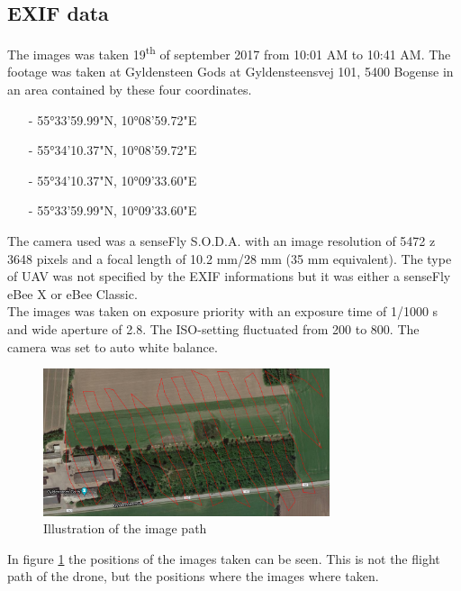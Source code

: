 \documentclass[../Head/Main.tex]{subfiles}
\begin{document}
\subsection{EXIF data}
The images was taken 19\textsuperscript{th} of september 2017 from 10:01 AM to 10:41 AM. The footage was taken at Gyldensteen Gods at Gyldensteensvej 101, 5400 Bogense in an area contained by these four coordinates.
\begin{itemize}
\item[-] 55°33'59.99"N, 10°08'59.72"E \vspace{-7pt}
\item[-] 55°34'10.37"N, 10°08'59.72"E \vspace{-7pt}
\item[-] 55°34'10.37"N, 10°09'33.60"E \vspace{-7pt}
\item[-] 55°33'59.99"N, 10°09'33.60"E
\end{itemize}

The camera used was a senseFly S.O.D.A. with an image resolution of 5472 z 3648 pixels and a focal length of 10.2 mm/28 mm (35 mm equivalent). The type of UAV was not specified by the EXIF informations but it was either a senseFly eBee X or eBee Classic.\\

The images was taken on exposure priority with an exposure time of 1/1000 s and wide aperture of 2.8. The ISO-setting fluctuated from 200 to 800. The camera was set to auto white balance.


\begin{figure}[H]
	\centering
	\includegraphics[width=0.75\textwidth]{../Figures/Flight_path}
	\caption{Illustration of the image path}
	\label{fig:flight_path}
\end{figure}
In figure \ref{fig:flight_path} the positions of the images taken can be seen. This is not the flight path of the drone, but the positions where the images where taken.
\end{document}
